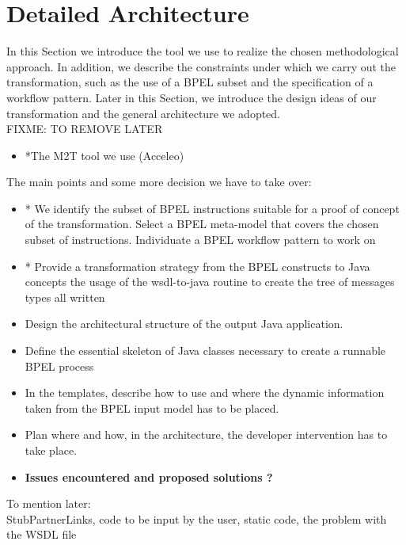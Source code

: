 \section{Detailed Architecture}
\label{DetailedArchitecture}
In this Section we introduce the tool we use to realize the chosen methodological approach. In addition, we describe the constraints under which we carry out the transformation, such as the use of a BPEL subset and the specification of a workflow pattern.
Later in this Section, we introduce the design ideas of our transformation and the general architecture we adopted.\\

FIXME: TO REMOVE LATER
\begin{itemize}
 \item *The M2T tool we use (Acceleo)
\end{itemize}

The main points and some more decision we have to take over:
\begin{itemize}
  \item * We identify the subset of BPEL instructions suitable for a proof of concept of the transformation. 
  \subitem * Select a BPEL meta-model that covers the chosen subset of instructions.
  \subitem * Individuate a BPEL workflow pattern to work on 
 
 \item * Provide a transformation strategy from the BPEL constructs to Java concepts
    \subitem * the usage of the wsdl-to-java routine to create the tree of messages types
    \subitem * all written
 \item Design the architectural structure of the output Java application.
 \item Define the essential skeleton of Java classes necessary to create a runnable BPEL process
 \item In the templates, describe how to use and where the dynamic information taken from the BPEL input model has to be placed.
 \item Plan where and how, in the architecture, the developer intervention has to take place.
 \item \textbf{Issues encountered and proposed solutions  ?}
\end{itemize} 
 
 To mention later: \\
 StubPartnerLinks, code to be input by the user, static code, the problem with the WSDL file

